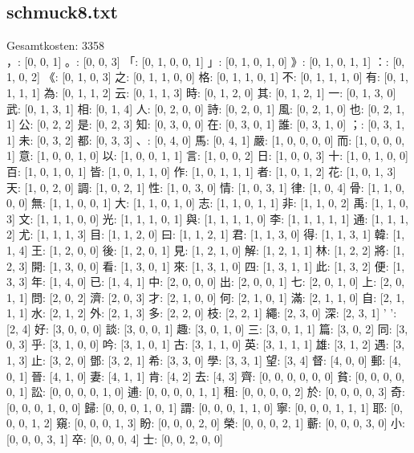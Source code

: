 \documentclass[a4paper,10pt,ngerman]{scrartcl}
\begin{document}
\subsection{schmuck8.txt}
Gesamtkosten: 3358\\
，: [0, 0, 1]
。: [0, 0, 3]
「: [0, 1, 0, 0, 1]
」: [0, 1, 0, 1, 0]
》: [0, 1, 0, 1, 1]
：: [0, 1, 0, 2]
《: [0, 1, 0, 3]
之: [0, 1, 1, 0, 0]
格: [0, 1, 1, 0, 1]
不: [0, 1, 1, 1, 0]
有: [0, 1, 1, 1, 1]
為: [0, 1, 1, 2]
云: [0, 1, 1, 3]
時: [0, 1, 2, 0]
其: [0, 1, 2, 1]
一: [0, 1, 3, 0]
武: [0, 1, 3, 1]
相: [0, 1, 4]
人: [0, 2, 0, 0]
詩: [0, 2, 0, 1]
風: [0, 2, 1, 0]
也: [0, 2, 1, 1]
公: [0, 2, 2]
是: [0, 2, 3]
知: [0, 3, 0, 0]
在: [0, 3, 0, 1]
誰: [0, 3, 1, 0]
；: [0, 3, 1, 1]
未: [0, 3, 2]
都: [0, 3, 3]
、: [0, 4, 0]
馬: [0, 4, 1]
嚴: [1, 0, 0, 0, 0]
而: [1, 0, 0, 0, 1]
意: [1, 0, 0, 1, 0]
以: [1, 0, 0, 1, 1]
言: [1, 0, 0, 2]
日: [1, 0, 0, 3]
十: [1, 0, 1, 0, 0]
百: [1, 0, 1, 0, 1]
皆: [1, 0, 1, 1, 0]
作: [1, 0, 1, 1, 1]
者: [1, 0, 1, 2]
花: [1, 0, 1, 3]
天: [1, 0, 2, 0]
調: [1, 0, 2, 1]
性: [1, 0, 3, 0]
情: [1, 0, 3, 1]
律: [1, 0, 4]
骨: [1, 1, 0, 0, 0]
無: [1, 1, 0, 0, 1]
大: [1, 1, 0, 1, 0]
志: [1, 1, 0, 1, 1]
非: [1, 1, 0, 2]
禹: [1, 1, 0, 3]
文: [1, 1, 1, 0, 0]
光: [1, 1, 1, 0, 1]
與: [1, 1, 1, 1, 0]
李: [1, 1, 1, 1, 1]
通: [1, 1, 1, 2]
尤: [1, 1, 1, 3]
目: [1, 1, 2, 0]
曰: [1, 1, 2, 1]
君: [1, 1, 3, 0]
得: [1, 1, 3, 1]
韓: [1, 1, 4]
王: [1, 2, 0, 0]
後: [1, 2, 0, 1]
見: [1, 2, 1, 0]
解: [1, 2, 1, 1]
林: [1, 2, 2]
將: [1, 2, 3]
開: [1, 3, 0, 0]
看: [1, 3, 0, 1]
來: [1, 3, 1, 0]
四: [1, 3, 1, 1]
此: [1, 3, 2]
便: [1, 3, 3]
年: [1, 4, 0]
已: [1, 4, 1]
中: [2, 0, 0, 0]
出: [2, 0, 0, 1]
七: [2, 0, 1, 0]
上: [2, 0, 1, 1]
問: [2, 0, 2]
濟: [2, 0, 3]
才: [2, 1, 0, 0]
何: [2, 1, 0, 1]
滿: [2, 1, 1, 0]
自: [2, 1, 1, 1]
水: [2, 1, 2]
外: [2, 1, 3]
多: [2, 2, 0]
枝: [2, 2, 1]
繩: [2, 3, 0]
深: [2, 3, 1]
' ': [2, 4]
好: [3, 0, 0, 0]
談: [3, 0, 0, 1]
趣: [3, 0, 1, 0]
三: [3, 0, 1, 1]
篇: [3, 0, 2]
同: [3, 0, 3]
乎: [3, 1, 0, 0]
吟: [3, 1, 0, 1]
古: [3, 1, 1, 0]
英: [3, 1, 1, 1]
雄: [3, 1, 2]
遇: [3, 1, 3]
止: [3, 2, 0]
鄧: [3, 2, 1]
希: [3, 3, 0]
學: [3, 3, 1]
望: [3, 4]
督: [4, 0, 0]
郵: [4, 0, 1]
晉: [4, 1, 0]
妻: [4, 1, 1]
肯: [4, 2]
去: [4, 3]
齊: [0, 0, 0, 0, 0, 0]
貧: [0, 0, 0, 0, 0, 1]
訟: [0, 0, 0, 0, 1, 0]
逋: [0, 0, 0, 0, 1, 1]
租: [0, 0, 0, 0, 2]
於: [0, 0, 0, 0, 3]
奇: [0, 0, 0, 1, 0, 0]
歸: [0, 0, 0, 1, 0, 1]
謂: [0, 0, 0, 1, 1, 0]
寧: [0, 0, 0, 1, 1, 1]
耶: [0, 0, 0, 1, 2]
窺: [0, 0, 0, 1, 3]
盼: [0, 0, 0, 2, 0]
榮: [0, 0, 0, 2, 1]
蘄: [0, 0, 0, 3, 0]
小: [0, 0, 0, 3, 1]
卒: [0, 0, 0, 4]
士: [0, 0, 2, 0, 0]
\end{document}
